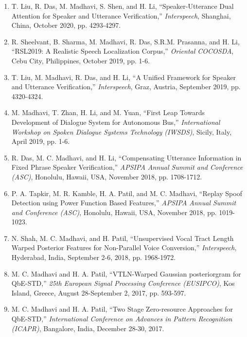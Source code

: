 \documentclass[10pt]{article}
\begin{document}
\begin{enumerate}[resume]
\item T. Liu, R. Das, M. Madhavi, S. Shen, and H. Li, ``Speaker-Utterance Dual Attention for Speaker and Utterance Verification,'' \textit{Interspeech}, Shanghai, China, October 2020, pp. 4293-4297.

\item R. Sheelvant, B. Sharma, M. Madhavi, R. Das, S.R.M. Prasanna, and H. Li, ``RSL2019: A Realistic Speech Localization Corpus,'' \textit{Oriental COCOSDA}, Cebu City, Philippines, October 2019, pp. 1-6.

\item T. Liu, M. Madhavi, R. Das, and H. Li, ``A Unified Framework for Speaker and Utterance Verification,'' \textit{Interspeech}, Graz, Austria, September 2019, pp. 4320-4324.

\item M. Madhavi, T. Zhan, H. Li, and M. Yuan, ``First Leap Towards Development of Dialogue System for Autonomous Bus,'' \textit{International Workshop on Spoken Dialogue Systems Technology (IWSDS)}, Sicily, Italy, April 2019, pp. 1-6.

\item R. Das, M. C. Madhavi, and H. Li, ``Compensating Utterance Information in Fixed Phrase Speaker Verification,'' \textit{APSIPA Annual Summit and Conference (ASC)}, Honolulu, Hawaii, USA, November 2018, pp. 1708-1712.

\item P. A. Tapkir, M. R. Kamble, H. A. Patil, and M. C. Madhavi, ``Replay Spoof Detection using Power Function Based Features,'' \textit{APSIPA Annual Summit and Conference (ASC)}, Honolulu, Hawaii, USA, November 2018, pp. 1019-1023.

\item N. Shah, M. C. Madhavi, and H. Patil, ``Unsupervised Vocal Tract Length Warped Posterior Features for Non-Parallel Voice Conversion,'' \textit{Interspeech}, Hyderabad, India, September 2-6, 2018, pp. 1968-1972.

\item M. C. Madhavi and H. A. Patil, ``VTLN-Warped Gaussian posteriorgram for QbE-STD,'' \textit{25th European Signal Processing Conference (EUSIPCO)}, Kos Island, Greece, August 28-September 2, 2017, pp. 593-597.

\item M. C. Madhavi and H. A. Patil, ``Two Stage Zero-resource Approaches for QbE-STD,'' \textit{International Conference on Advances in Pattern Recognition (ICAPR)}, Bangalore, India, December 28-30, 2017.


\end{enumerate}
\end{document}
